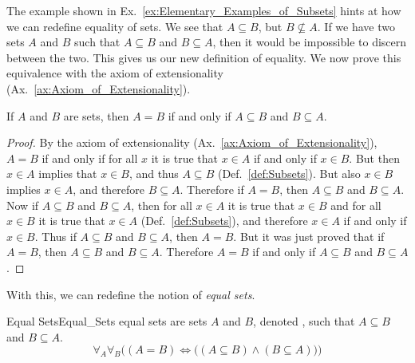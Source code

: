         The example shown in Ex.~\ref{ex:Elementary_Examples_of_Subsets} hints
        at how we can redefine equality of sets. We see that $A\subseteq{B}$,
        but $B\nsubseteq{A}$. If we have two sets $A$ and $B$ such that
        $A\subseteq{B}$ and $B\subseteq{A}$, then it would be impossible to
        discern between the two. This gives us our new definition of equality.
        We now prove this equivalence with the axiom of extensionality%
         (Ax.~\ref{ax:Axiom_of_Extensionality}).
        \begin{theorem}
            \label{thm:Equivalent_Def_of_Equality}%
            If $A$ and $B$ are sets, then $A=B$ if and only if $A\subseteq{B}$
            and $B\subseteq{A}$.
        \end{theorem}
        \begin{proof}
            By the axiom of extensionality
            (Ax.~\ref{ax:Axiom_of_Extensionality}), $A=B$ if and only if for
            all $x$ it is true that $x\in{A}$ if and only if $x\in{B}$. But then
            $x\in{A}$ implies that $x\in{B}$, and thus $A\subseteq{B}$
            (Def.~\ref{def:Subsets}). But also $x\in{B}$ implies $x\in{A}$, and
            therefore $B\subseteq{A}$. Therefore if $A=B$, then $A\subseteq{B}$
            and $B\subseteq{A}$. Now if $A\subseteq{B}$ and $B\subseteq{A}$,
            then for all $x\in{A}$ it is true that $x\in{B}$ and for all
            $x\in{B}$ it is true that $x\in{A}$ (Def.~\ref{def:Subsets}), and
            therefore $x\in{A}$ if and only if $x\in{B}$. Thus if
            $A\subseteq{B}$ and $B\subseteq{A}$, then $A=B$. But it was just
            proved that if $A=B$, then $A\subseteq{B}$ and $B\subseteq{A}$.
            Therefore $A=B$ if and only if $A\subseteq{B}$ and $B\subseteq{A}$.
        \end{proof}
        With this, we can redefine the notion of
        \textit{equal sets}.
        \begin{fdefinition}{Equal Sets}{Equal_Sets}
            \Glspl{equal set} are \glspl{set} $A$ and $B$, denoted
            , such that $A\subseteq{B}$ and
            $B\subseteq{A}$.
            \begin{equation*}
                \forall_{A}\forall_{B}\Big((A=B)\Longleftrightarrow
                \big((A\subseteq{B})\land(B\subseteq{A})\big)\Big)
            \end{equation*}
        \end{fdefinition}
